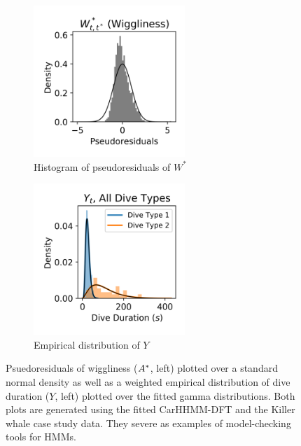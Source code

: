 \begin{figure}[ht]
    \begin{subfigure}{0.45\textwidth}
    	\centering
    	\includegraphics[width=2.25in]{../Plots/CarHHMM2_psedoresids_ahat.png}
    	\caption{Histogram of pseudoresiduals of $W^*$}
    	\label{fig:pseudoresids}
    \end{subfigure}
    \begin{subfigure}{0.45\textwidth}
    	\centering
    	\includegraphics[width=2.25in]{../Plots/CarHHMM2_empirical_hist_dive_duration.png}
    	\caption{Empirical distribution of $Y$}
    	\label{fig:empirical_dist}
    \end{subfigure}
    \caption{Psuedoresiduals of wiggliness ($A^*$, left) plotted over a standard normal density as well as a weighted empirical distribution of dive duration ($Y$, left) plotted over the fitted gamma distributions. Both plots are generated using the fitted CarHHMM-DFT and the Killer whale case study data. They severe as examples of model-checking tools for HMMs.}
    \label{fig:model_checking}
\end{figure}



